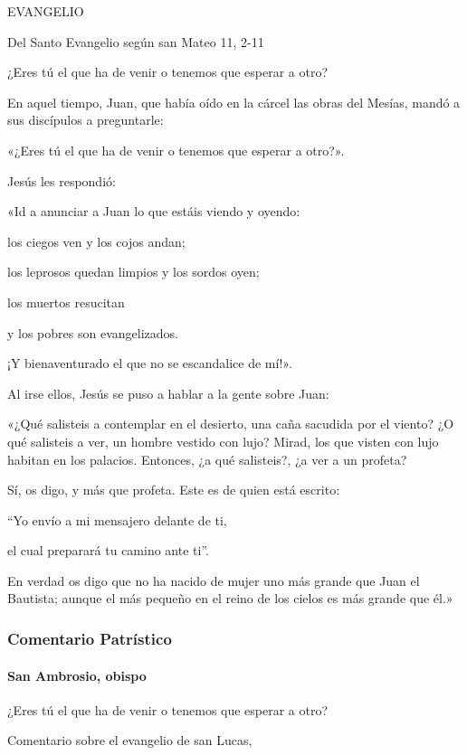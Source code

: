 \documentclass[]{article}
\let\oldparagraph\paragraph
\renewcommand{\paragraph}[1]{\oldparagraph{#1}\mbox{}}
\begin{document}
EVANGELIO

Del Santo Evangelio según san Mateo 11, 2-11

¿Eres tú el que ha de venir o tenemos que esperar a otro?

En aquel tiempo, Juan, que había oído en la cárcel las obras del Mesías,
mandó a sus discípulos a preguntarle:

«¿Eres tú el que ha de venir o tenemos que esperar a otro?».

Jesús les respondió:

«Id a anunciar a Juan lo que estáis viendo y oyendo:

los ciegos ven y los cojos andan;

los leprosos quedan limpios y los sordos oyen;

los muertos resucitan

y los pobres son evangelizados.

¡Y bienaventurado el que no se escandalice de mí!».

Al irse ellos, Jesús se puso a hablar a la gente sobre Juan:

«¿Qué salisteis a contemplar en el desierto, una caña sacudida por el
viento? ¿O qué salisteis a ver, un hombre vestido con lujo? Mirad, los
que visten con lujo habitan en los palacios. Entonces, ¿a qué
salisteis?, ¿a ver a un profeta?

Sí, os digo, y más que profeta. Este es de quien está escrito:

``Yo envío a mi mensajero delante de ti,

el cual preparará tu camino ante ti''.

En verdad os digo que no ha nacido de mujer uno más grande que Juan el
Bautista; aunque el más pequeño en el reino de los cielos es más grande
que él.»

\protect\hypertarget{_Toc448662735}{}{}

\subsubsection{Comentario Patrístico}\label{comentario-patruxedstico-2}

\paragraph{San Ambrosio, obispo}\label{san-ambrosio-obispo}

¿Eres tú el que ha de venir o tenemos que esperar a otro?

Comentario sobre el evangelio de san Lucas,  
\end{document}
